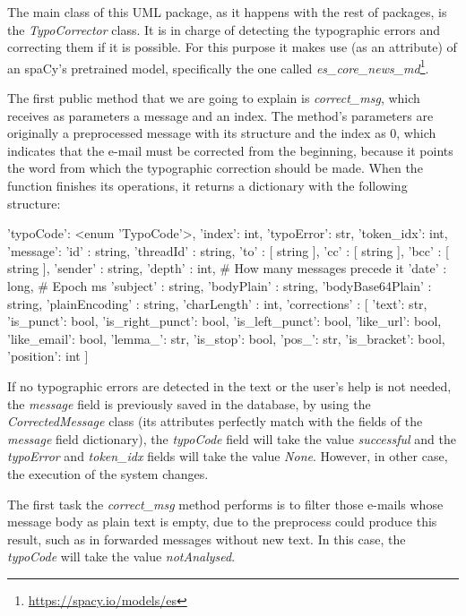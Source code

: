 The main class of this UML package, as it happens with the rest of packages, is the \textit{TypoCorrector} class. It is in charge of detecting the typographic errors and correcting them if it is possible. For this purpose it makes use (as an attribute) of an spaCy's pretrained model, specifically the one called \textit{es\_core\_news\_md}\footnote{\url{https://spacy.io/models/es}}.

The first public method that we are going to explain is \textit{correct\_msg}, which receives as parameters a message and an index. The method's parameters are originally a preprocessed message with its structure and the index as 0, which indicates that the e-mail must be corrected from the beginning, because it points the word from which the typographic correction should be made. When the function finishes its operations, it returns a dictionary with the following structure:

\begin{python}
{
	'typoCode': <enum 'TypoCode'>,
	'index': int,
	'typoError': str,
	'token_idx': int,
	'message': {
		'id' : string,
		'threadId' : string,
		'to' : [ string ],
		'cc' : [ string ],
		'bcc' : [ string ],
		'sender' : string,
		'depth' : int,               # How many messages precede it
		'date' : long,               # Epoch ms
		'subject' : string,
		'bodyPlain' : string,
		'bodyBase64Plain' : string,
		'plainEncoding' : string,
		'charLength' : int,
		'corrections' : [
		{
			'text': str,
			'is_punct': bool,
			'is_right_punct': bool,
			'is_left_punct': bool,
			'like_url': bool,
			'like_email': bool,
			'lemma_': str,
			'is_stop': bool,
			'pos_': str,
			'is_bracket': bool,
			'position': int
		}
		]
	}
}
\end{python}

If no typographic errors are detected in the text or the user's help is not needed, the \textit{message} field is previously saved in the database, by using the \textit{CorrectedMessage} class (its attributes perfectly match with the fields of the \textit{message} field dictionary), the \textit{typoCode} field will take the value \textit{successful} and the \textit{typoError} and \textit{token\_idx} fields will take the value \textit{None}. However, in other case, the execution of the system changes.

The first task the \textit{correct\_msg} method performs is to filter those e-mails whose message body as plain text is empty, due to the preprocess could produce this result, such as in forwarded messages without new text. In this case, the \textit{typoCode} will take the value \textit{notAnalysed}.

